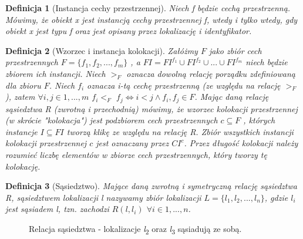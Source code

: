 \documentclass[12pt]{article}
\newtheorem{defin}{Definicja}
\begin{document}
\begin{defin}[Instancja cechy przestrzennej]
Niech f będzie cechą przestrzenną. Mówimy, że obiekt x jest instancją cechy przestrzennej f, wtedy i tylko wtedy, gdy obiekt x jest typu f oraz jest opisany przez lokalizację i identyfikator.
\end{defin}

\begin{defin}[Wzorzec i instancja kolokacji]
Załóżmy $F$ jako zbiór cech przestrzennych $F = \{ f_{1}, f_{2}, ...,f_{m} \} $ , a $FI = FI^{f_{1}} \cup FI^{f_{2}} \cup ... \cup FI^{f_{m}}$ niech będzie
zbiorem ich instancji. Niech $ >_{F} $ oznacza dowolną relację porządku zdefiniowaną dla zbioru $ F $. Niech $ f_{i} $ oznacza i-tą cechę przestrzenną (ze względu na relację $ >_{F} $), zatem $ \forall i,j \in 1,...,m $ $ f_{i} <_{F} $ $ f_{j} \Leftrightarrow i < j \land f_{i},f_{j} \in F $. Mając daną relację sąsiedztwa R (zwrotną i przechodnią) mówimy, że wzorzec kolokacji przestrzennej (w skrócie "kolokacja") jest podzbiorem cech przestrzennych $ c \subseteq F $ , których instancje $ I\subseteq FI $ tworzą klikę ze względu na relację R. Zbiór wszystkich instancji kolokacji przestrzennej $c$ jest oznaczany przez $CI^{c} $. Przez długość kolokacji należy rozumieć liczbę elementów w zbiorze cech przestrzennych, który tworzy tę kolokację.
\end{defin}

\begin{defin}[Sąsiedztwo]
Mające daną zwrotną i symetryczną relację sąsiedztwa R, sąsiedztwem lokalizacji l nazywamy zbiór lokalizacji $L = \{l_{1},l_{2}, . . . , l_{n}\}$, gdzie $l_{i}$ jest sąsiadem l, tzn. zachodzi $R(l, l_{i}) $ $ \forall i \in 1,...,n$.
\end{defin}

\begin{figure}
\centering
{}
\caption{Relacja sąsiedztwa - lokalizacje \textit{l}\textsubscript{2} oraz \textit{l}\textsubscript{3} sąsiadują ze sobą.}
\end{figure}
\end{document}
